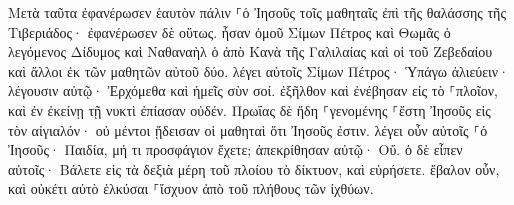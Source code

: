 \documentclass{openreader}
\begin{document}
Μετὰ ταῦτα ἐφανέρωσεν ἑαυτὸν πάλιν ⸀ὁ Ἰησοῦς τοῖς μαθηταῖς ἐπὶ τῆς θαλάσσης τῆς Τιβεριάδος· ἐφανέρωσεν δὲ οὕτως. 
ἦσαν ὁμοῦ Σίμων Πέτρος καὶ Θωμᾶς ὁ λεγόμενος Δίδυμος καὶ Ναθαναὴλ ὁ ἀπὸ Κανὰ τῆς Γαλιλαίας καὶ οἱ τοῦ Ζεβεδαίου καὶ ἄλλοι ἐκ τῶν μαθητῶν αὐτοῦ δύο. 
λέγει αὐτοῖς Σίμων Πέτρος· Ὑπάγω ἁλιεύειν· λέγουσιν αὐτῷ· Ἐρχόμεθα καὶ ἡμεῖς σὺν σοί. ἐξῆλθον καὶ ἐνέβησαν εἰς τὸ ⸀πλοῖον, καὶ ἐν ἐκείνῃ τῇ νυκτὶ ἐπίασαν οὐδέν. 
Πρωΐας δὲ ἤδη ⸀γενομένης ⸀ἔστη Ἰησοῦς εἰς τὸν αἰγιαλόν· οὐ μέντοι ᾔδεισαν οἱ μαθηταὶ ὅτι Ἰησοῦς ἐστιν. 
λέγει οὖν αὐτοῖς ⸀ὁ Ἰησοῦς· Παιδία, μή τι προσφάγιον ἔχετε; ἀπεκρίθησαν αὐτῷ· Οὔ. 
ὁ δὲ εἶπεν αὐτοῖς· Βάλετε εἰς τὰ δεξιὰ μέρη τοῦ πλοίου τὸ δίκτυον, καὶ εὑρήσετε. ἔβαλον οὖν, καὶ οὐκέτι αὐτὸ ἑλκύσαι ⸀ἴσχυον ἀπὸ τοῦ πλήθους τῶν ἰχθύων. 
\end{document}
